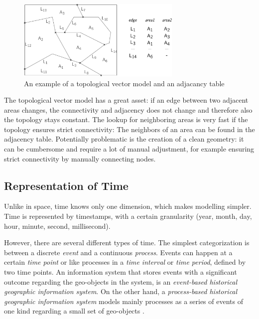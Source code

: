 \begin{figure}[ht]
  \centering
  \includegraphics[width=0.7\textwidth]{graphics/basics/topological_vector_model}
  \caption{An example of a topological vector model and an adjacancy table}
  \label{fig:topological_vector_model}
\end{figure}

The topological vector model has a great asset: if an edge between two adjacent areas changes, the connectivity and adjacency does not change and therefore also the topology stays constant. The lookup for neighboring areas is very fast if the topology ensures strict connectivity: The neighbors of an area can be found in the adjacency table. Potentially problematic is the creation of a clean geometry: it can be cumbersome and require a lot of manual adjustment, for example ensuring strict connectivity by manually connecting nodes.



\subsection{Representation of Time} %
\label{sub:representation_of_time}

Unlike in space, time knows only one dimension, which makes modelling simpler. Time is represented by timestamps, with a certain granularity (year, month, day, hour, minute, second, millisecond).

However, there are several different types of time. The simplest categorization is between a discrete \emph{event} and a continuous \emph{process}. Events can happen at a certain \emph{time point} or like processes in a \emph{time interval} or \emph{time period}, defined by two time points. An information system that stores events with a significant outcome regarding the geo-objects in the system, is an \emph{event-based historical geographic information system}. On the other hand, a \emph{process-based historical geographic information system} models mainly processes as a series of events of one kind regarding a small set of geo-objects
\cite[chapter 2, pp. 47-49]{solana2014spatio}.

